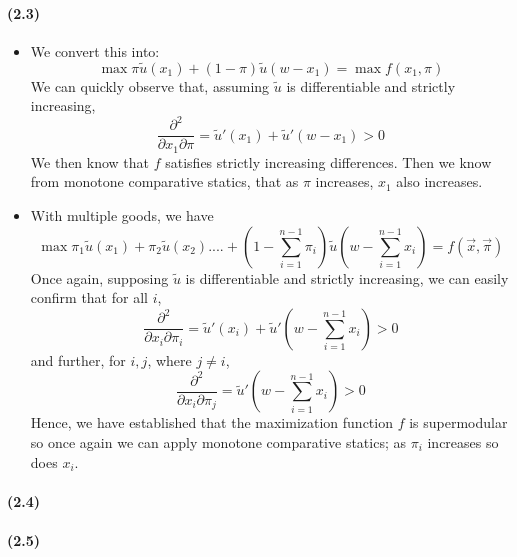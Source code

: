 \documentclass[10pt,letter]{article}
\begin{document}
\paragraph{(2.3)}
\begin{itemize}
\item We convert this into:
\[ \max \pi \tilde{u}(x_1) + (1-\pi) \tilde{u}(w - x_1) = \max f(x_1, \pi) \]
We can quickly observe that, assuming $\tilde{u}$ is differentiable and strictly increasing,
\[ \frac{\partial^2 }{\partial x_1 \partial \pi} = \tilde{u}'(x_1) + \tilde{u}'(w-x_1) > 0 \]
We then know that $f$ satisfies strictly increasing differences. Then we know from monotone comparative statics, that as $\pi$ increases, $x_1$ also increases.
\item With multiple goods, we have
\[ \max \pi_1 \tilde{u}(x_1) + \pi_2 \tilde{u}(x_2) .... + (1 - \sum_{i=1}^{n-1} \pi_i )\tilde{u} \left(w - \sum_{i=1}^{n-1} x_i \right) = f(\vec{x}, \vec{\pi}) \]
Once again, supposing $\tilde{u}$ is differentiable and strictly increasing, we can easily confirm that for all $i$,
\[ \frac{\partial^2 }{\partial x_i \partial \pi_i} = \tilde{u}'(x_i) + \tilde{u}'\left(w - \sum_{i=1}^{n-1} x_i \right) > 0  \]
and further, for $i, j$, where $j \neq i$,
\[ \frac{\partial^2 }{\partial x_i \partial \pi_j} = \tilde{u}'\left(w - \sum_{i=1}^{n-1} x_i \right) > 0 \]
Hence, we have established that the maximization function $f$ is supermodular so once again we can apply monotone comparative statics; as $\pi_i$ increases so does $x_i$.
\end{itemize}
\paragraph{(2.4)}
\paragraph{(2.5)}
\end{document}
